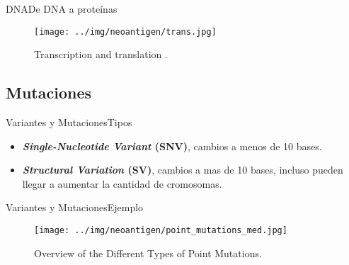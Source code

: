 \documentclass[10pt]{beamer}
\newcommand{\1}{
	\setbeamertemplate{background}{
		\texttt{[image: ../img/1]}
		\tikz[overlay] \fill[fill opacity=0.75,fill=white] (0,0) rectangle (-\paperwidth,\paperheight);
	}
}
\begin{document}
\begin{frame}{DNA}{De DNA a proteínas}
	\begin{figure}[]
		\centering
		\texttt{[image: ../img/neoantigen/trans.jpg]}
		\caption{Transcription and translation \cite{nci2020}.}
	\end{figure}
\end{frame}

\subsection{Mutaciones}

\begin{frame}{Variantes y Mutaciones}{Tipos}
	\begin{block}{}
		\begin{itemize}
			\item \textbf{\textit{Single-Nucleotide Variant} (SNV)}, cambios a menos de 10 bases.
			\item \textbf{\textit{Structural Variation} (SV)}, cambios a mas de 10 bases, incluso pueden llegar a aumentar la cantidad de cromosomas.
		\end{itemize}	
	\end{block}
\end{frame}

\begin{frame}{Variantes y Mutaciones}{Ejemplo}
	\begin{figure}[]
		\centering
		\texttt{[image: ../img/neoantigen/point\_mutations\_med.jpg]}
		\label{img:alig}
		\caption{Overview of the Different Types of Point Mutations.}
	\end{figure}
\end{frame}
\end{document}
